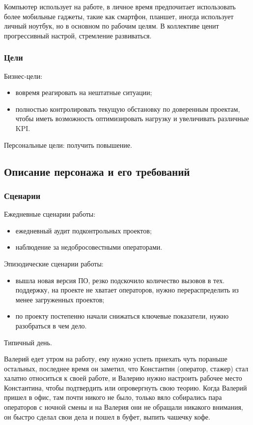 Компьютер использует на работе,
в личное время предпочитает использовать более мобильные гаджеты,
такие как смартфон, планшет, иногда использует личный ноутбук,
но в основном по рабочим целям.
В коллективе ценит прогрессивный настрой, стремление развиваться.

\subsubsection{Цели}

Бизнес-цели:
\begin{itemize}
    \item вовремя реагировать на нештатные ситуации;
    \item полностью контролировать текущую обстановку по доверенным проектам, чтобы иметь возможность оптимизировать нагрузку и увеличивать различные KPI\@.
\end{itemize}

Персональные цели: получить повышение.

\subsection{Описание персонажа и его требований}

\subsubsection{Сценарии}

Ежедневные сценарии работы:
\begin{itemize}
    \item ежедневный аудит подконтрольных проектов;
    \item наблюдение за недобросовестными операторами.
\end{itemize}

Эпизодические сценарии работы:
\begin{itemize}
    \item вышла новая версия ПО, резко подскочило количество вызовов в тех. поддержку, на проекте не хватает операторов, нужно перераспределить из менее загруженных проектов;
    \item по проекту постепенно начали снижаться ключевые показатели, нужно разобраться в чем дело.
\end{itemize}

Типичный день.

Валерий едет утром на работу, ему нужно успеть приехать чуть пораньше остальных,
последнее время он заметил, что Константин (оператор, стажер)
стал халатно относиться к своей работе,
и Валерию нужно настроить рабочее место Константина,
чтобы подтвердить или опровергнуть свою теорию.
Когда Валерий пришел в офис, там почти никого не было,
только вяло собирались пара операторов с ночной смены
и на Валерия они не обращали никакого внимания,
он быстро сделал свои дела и пошел в буфет, выпить чашечку кофе.

